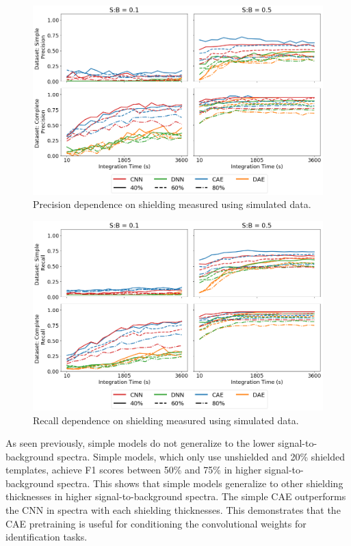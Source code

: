 \begin{figure}[H]
	\centering
	\includegraphics[width=1.0\linewidth]{images/sim-generalization-ironshield-precision}
	\caption{Precision dependence on shielding measured using simulated data.}
	\label{fig:sim-generalization-ironshield-precision}
\end{figure}

\begin{figure}[H]
	\centering
	\includegraphics[width=1.0\linewidth]{images/sim-generalization-ironshield-recall}
	\caption{Recall dependence on shielding measured using simulated data.}
	\label{fig:sim-generalization-ironshield-recall}
\end{figure}

As seen previously, simple models do not generalize to the lower signal-to-background spectra. Simple models, which only use unshielded and 20\% shielded templates, achieve F1 scores between 50\% and 75\% in higher signal-to-background spectra. This shows that simple models generalize to other shielding thicknesses in higher signal-to-background spectra. The simple CAE outperforms the CNN in spectra with each shielding thicknesses. This demonstrates that the CAE pretraining is useful for conditioning the convolutional weights for identification tasks. 

